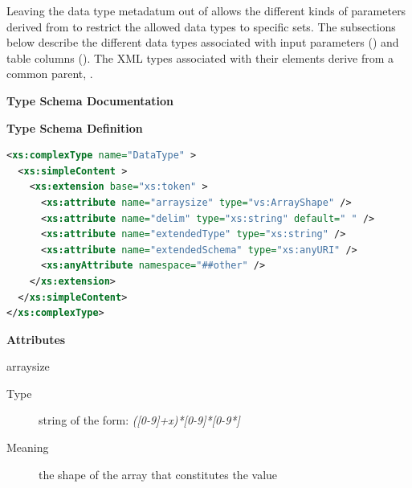 \documentclass[11pt,a4paper]{ivoa}
\begin{document}

Leaving the data type metadatum out of 
allows the different kinds of parameters derived from
 to restrict the allowed data types to
specific sets.  The subsections below describe the different data
types associated with input parameters
() and table
columns ().  The
XML types associated with their  elements
derive from a common parent, .


\begin{generated}
\begingroup
      	\renewcommand*\descriptionlabel[1]{%
      	\hbox to 5.5em{\emph{#1}\hfil}}\vspace{2ex}\noindent\textbf{ Type Schema Documentation}



\vspace{1ex}\noindent\textbf{ Type Schema Definition}

\begin{lstlisting}[language=XML,basicstyle=\footnotesize]
<xs:complexType name="DataType" >
  <xs:simpleContent >
    <xs:extension base="xs:token" >
      <xs:attribute name="arraysize" type="vs:ArrayShape" />
      <xs:attribute name="delim" type="xs:string" default=" " />
      <xs:attribute name="extendedType" type="xs:string" />
      <xs:attribute name="extendedSchema" type="xs:anyURI" />
      <xs:anyAttribute namespace="##other" />
    </xs:extension>
  </xs:simpleContent>
</xs:complexType>
\end{lstlisting}

\vspace{0.5ex}\noindent\textbf{ Attributes}

\begingroup\small\begin{bigdescription}
\item[arraysize]
\begin{description}
\item[Type] string of the form: \emph{([0-9]+x)*[0-9]*[0-9*]}
\item[Meaning] 
                     the shape of the array that constitutes the value
                  

\end{description}
\end{bigdescription}
\end{generated}
\end{document}

